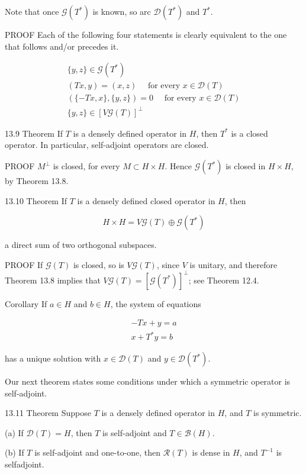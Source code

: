 \documentclass[10pt]{article}
\begin{document}
Note that once $\mathscr{G}\left(T^{*}\right)$ is known, so arc $\mathscr{D}\left(T^{*}\right)$ and $T^{*}$.

PROOF Each of the following four statements is clearly equivalent to the one that follows and/or precedes it.

$$
\begin{gathered}
\{y, z\} \in \mathscr{G}\left(T^{*}\right) \\
(T x, y)=(x, z) \quad \text { for every } x \in \mathscr{D}(T) \\
(\{-T x, x\},\{y, z\})=0 \quad \text { for every } x \in \mathscr{D}(T) \\
\{y, z\} \in[V \mathscr{G}(T)]^{\perp}
\end{gathered}
$$

13.9 Theorem If $T$ is a densely defined operator in $H$, then $T^{*}$ is a closed operator. In particular, self-adjoint operators are closed.

PROOF $M^{\perp}$ is closed, for every $M \subset H \times H$. Hence $\mathscr{G}\left(T^{*}\right)$ is closed in $H \times H$, by Theorem 13.8.

13.10 Theorem If $T$ is a densely defined closed operator in $H$, then

$$
H \times H=V \mathscr{G}(T) \oplus \mathscr{G}\left(T^{*}\right)
$$

a direct sum of two orthogonal subspaces.

PROOF If $\mathscr{G}(T)$ is closed, so is $V \mathscr{G}(T)$, since $V$ is unitary, and therefore Theorem 13.8 implies that $V \mathscr{G}(T)=\left[\mathscr{G}\left(T^{*}\right)\right]^{\perp}$; see Theorem 12.4.

Corollary If $a \in H$ and $b \in H$, the system of equations

$$
\begin{array}{r}
-T x+y=a \\
x+T^{*} y=b
\end{array}
$$

has a unique solution with $x \in \mathscr{D}(T)$ and $y \in \mathscr{D}\left(T^{*}\right)$.

Our next theorem states some conditions under which a symmetric operator is self-adjoint.

13.11 Theorem Suppose $T$ is a densely defined operator in $H$, and $T$ is symmetric.

(a) If $\mathscr{D}(T)=H$, then $T$ is self-adjoint and $T \in \mathscr{B}(H)$.

(b) If $T$ is self-adjoint and one-to-one, then $\mathscr{R}(T)$ is dense in $H$, and $T^{-1}$ is selfadjoint.
\end{document}
